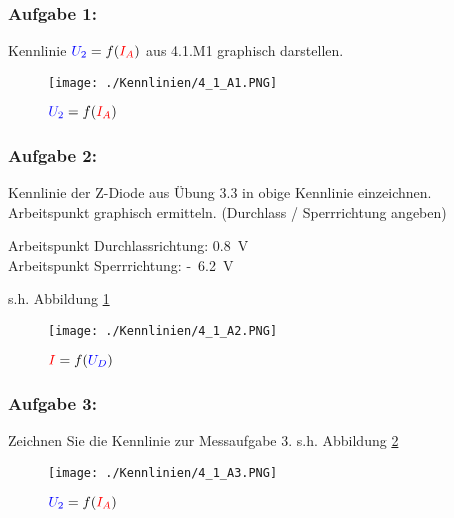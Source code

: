 \documentclass[a4paper,titlepage,parskip]{scrreprt}
\newcommand{\spannung}[1]{\textcolor{blue}{#1}}
\newcommand{\strom}[1]{\textcolor{red}{#1}}
\begin{document}
            \subsubsection{Aufgabe 1:} Kennlinie $\spannung{U_2} = f(\strom{I_A})$ aus 4.1.M1 graphisch darstellen.
            	\begin{figure}[!htbp]
            		\begin{center}
                  		\texttt{[image: ./Kennlinien/4\_1\_A1.PNG]}

                     		\caption{$\spannung{U_2} = f(\strom{I_A})$}

             		\end{center}
        		\end{figure}
			\pagebreak
			\subsubsection{Aufgabe 2:} Kennlinie der Z-Diode aus Übung 3.3 in obige Kennlinie einzeichnen. Arbeitspunkt graphisch ermitteln. (Durchlass / Sperrrichtung angeben)
            
                Arbeitspunkt Durchlassrichtung: \SI{0,8}{\volt}\\
                Arbeitspunkt Sperrrichtung: \SI{6,2}[-]{\volt}
                
                s.h. Abbildung \ref{fig:4_1_A2}
				\begin{figure}[!htbp]
                  	\begin{center}
                      	\texttt{[image: ./Kennlinien/4\_1\_A2.PNG]}

                       		\caption{$\strom{I} = f(\spannung{U_D})$}

                           	\label{fig:4_1_A2}
              		\end{center}
             	\end{figure}
			\subsubsection{Aufgabe 3:} Zeichnen Sie die Kennlinie zur Messaufgabe 3.
                s.h. Abbildung \ref{fig:4_1_A3}
				\begin{figure}[!htbp]
                  	\begin{center}
                      	\texttt{[image: ./Kennlinien/4\_1\_A3.PNG]}

                       		\caption{$\spannung{U_2} = f(\strom{I_A})$}

                           	\label{fig:4_1_A3}
              		\end{center}
             	\end{figure}
			\pagebreak			
\end{document}
